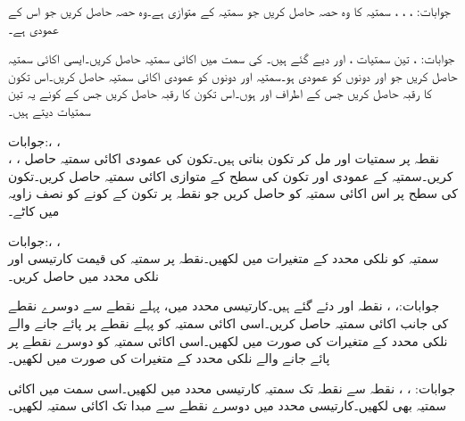 جوابات: ، ، ، 
سمتیہ  کا وہ حصہ حاصل کریں جو سمتیہ  کے متوازی ہے۔وہ حصہ حاصل کریں جو اس کے عمودی ہے۔ 

جوابات: ، 
تین سمتیات ،  اور  دیے گئے ہیں۔ کی سمت میں اکائی سمتیہ حاصل کریں۔ایسی اکائی سمتیہ حاصل کریں جو  اور  دونوں کو عمودی ہو۔سمتیہ  اور  دونوں کو عمودی اکائی سمتیہ حاصل کریں۔اس تکون کا رقبہ حاصل کریں جس کے اطراف  اور  ہوں۔اس تکون کا رقبہ حاصل کریں جس کے کونے یہ تین سمتیات دیتے ہیں۔ 

جوابات:، ، \\
، ، 
نقطہ  پر سمتیات  اور  مل کر تکون بناتی ہیں۔تکون کی عمودی اکائی سمتیہ حاصل کریں۔سمتیہ  کے عمودی اور تکون کی سطح کے متوازی اکائی سمتیہ حاصل کریں۔تکون کی سطح پر اس اکائی سمتیہ کو حاصل کریں جو نقطہ  پر تکون کے کونے کو نصف زاویہ میں کاٹے۔

جوابات:، ، \\
سمتیہ  کو نلکی محدد کے متغیرات میں لکھیں۔نقطہ  پر سمتیہ کی قیمت کارتیسی اور نلکی محدد میں حاصل کریں۔

جوابات:، ، 
نقطہ  اور  دئے گئے ہیں۔کارتیسی محدد میں، پہلے نقطے سے دوسرے نقطے کی جانب اکائی سمتیہ حاصل کریں۔اسی اکائی سمتیہ کو پہلے نقطے پر پائے جانے والے نلکی محدد کے متغیرات کی صورت میں لکھیں۔اسی اکائی سمتیہ کو دوسرے نقطے پر پائے جانے والے نلکی محدد کے متغیرات کی صورت میں لکھیں۔

جوابات: ، ، 
نقطہ  سے نقطہ  تک سمتیہ کارتیسی محدد میں لکھیں۔اسی سمت میں اکائی سمتیہ بھی لکھیں۔کارتیسی محدد میں دوسرے نقطے سے مبدا تک اکائی سمتیہ لکھیں۔


